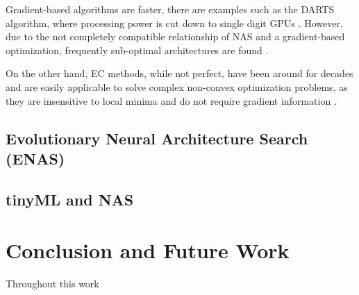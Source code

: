 \documentclass[10pt,        %
               a4paper,     %
               journal,     %
               ]{IEEEtran}
\begin{document}
Gradient-based algorithms are faster, there are examples such as the DARTS algorithm, where processing power
is cut down to single digit GPUs \cite{liu2018darts}. However, due to the not completely compatible relationship
of NAS and a gradient-based optimization, frequently sub-optimal architectures are found \cite{liu2021survey}.

On the other hand, EC methods, while not perfect, have been around for decades and are easily applicable
to solve complex non-convex optimization problems, as they are insensitive to local minima and do not require
gradient information \cite{liu2021survey}.

\subsection{Evolutionary Neural Architecture Search (ENAS)}
\label{EV}

\subsection{tinyML and NAS}

\section{Conclusion and Future Work}
Throughout this work

\newpage



%
\end{document}
